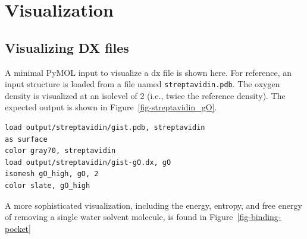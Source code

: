 \documentclass[9pt,tutorial]{livecoms}
\newcommand\inlinecode{\texttt}
\begin{document}
\section{Visualization}
\label{sec:visualization}
\subsection{Visualizing DX files}
A minimal PyMOL input to visualize a dx file is shown here.
For reference, an input structure is loaded from a file named \inlinecode{streptavidin.pdb}.
The oxygen density is visualized at an isolevel of 2 (i.e., twice the reference density).
The expected output is shown in Figure~\ref{fig-streptavidin_gO}.

\begin{lstlisting}[style=pymol]
load output/streptavidin/gist.pdb, streptavidin
as surface
color gray70, streptavidin
load output/streptavidin/gist-gO.dx, gO
isomesh gO_high, gO, 2
color slate, gO_high
\end{lstlisting}
A more sophisticated visualization, including the energy, entropy, and free energy of removing a single water solvent 
molecule, is found in Figure~\ref{fig-binding-pocket}
\end{document}
